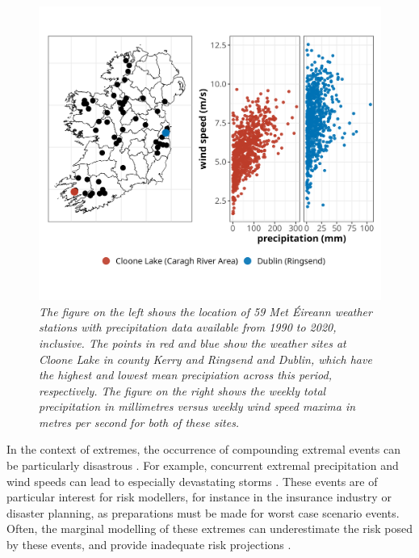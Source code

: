 \documentclass{article}
\numberwithin{equation}{section}
\begin{document}
\begin{figure}[H]
    \centering
    \includegraphics[width = 0.9\linewidth]{plots/02_mot_ex_plot.png}
    \caption{\emph{The figure on the left shows the location of 59 Met Éireann weather stations with precipitation data available from 1990 to 2020, inclusive. The points in red and blue show the weather sites at Cloone Lake in county Kerry and Ringsend and Dublin, which have the highest and lowest mean precipiation across this period, respectively. The figure on the right shows the weekly total precipitation in millimetres versus weekly wind speed maxima in metres per second for both of these sites.}}
    \label{fig:02_locs}
\end{figure}

In the context of extremes, the occurrence of compounding extremal events can be particularly disastrous \citep{Vignotto2021, Leonard2014}.
For example, concurrent extremal precipitation and wind speeds can lead to especially devastating storms \citep{Martius2016}.
These events are of particular interest for risk modellers, for instance in the insurance industry or disaster planning, as preparations must be made for worst case scenario events.
Often, the marginal modelling of these extremes can underestimate the risk posed by these events, and provide inadequate risk projections \citep{Zscheischler2017}.
\end{document}
